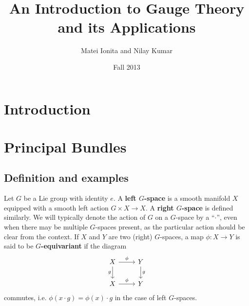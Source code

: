 \documentclass{book}
\title{An Introduction to Gauge Theory and its Applications}
\author{Matei Ionita and Nilay Kumar}
\date{Fall 2013}
\theoremstyle{plain}
\theoremstyle{definition}
\theoremstyle{remark}
\begin{document}
\maketitle

\tableofcontents

\newpage

\chapter{Introduction}


\chapter{Principal Bundles}

\section{Definition and examples}

Let $G$ be a Lie group with identity $e$. A \textbf{left $G$-space} is a smooth manifold $X$ equipped with a smooth left action $G\times X\to X$. 
A \textbf{right $G$-space} is defined similarly.  We will typically denote the action of $G$ on a $G$-space by a ``$\cdot$'', even when there may
be multiple $G$-spaces present, as the particular action should be clear from the context.
If $X$ and $Y$ are two (right) $G$-spaces, a map $\phi:X\to Y$ is said to be \textbf{$G$-equivariant} if the diagram
\[\begin{tikzcd}
        X\arrow[swap]{d}{g}\arrow{r}{\phi}&Y\arrow{d}{g}\\
        X\arrow{r}{\phi}&Y
\end{tikzcd}\]
commutes, i.e. $\phi(x\cdot g)=\phi(x)\cdot g$ in the case of left $G$-spaces.
\end{document}
